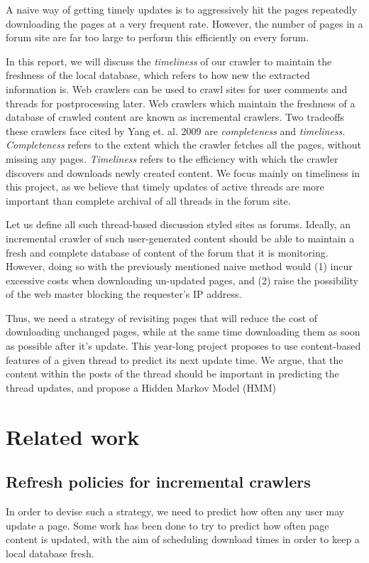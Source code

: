 \documentclass[12 pt]{article}
\begin{document}
A naive way of getting timely updates is to aggressively hit the pages repeatedly downloading the pages at a very
frequent rate. However, the number of pages in a forum site are far too large to perform this efficiently on every
forum.

In this report, we will discuss the \emph{timeliness} of our crawler to maintain the freshness of the local database, which refers to how new the extracted information is. Web crawlers can be used to crawl sites for user comments and threads for postprocessing later. Web crawlers which maintain the freshness of a database of crawled content are known as incremental crawlers. Two tradeoffs these crawlers face cited by Yang et. al. 2009 \cite{Yang2009} are \emph{completeness} and \emph{timeliness}. \emph{Completeness} refers to the extent which the crawler fetches all the pages, without missing any pages. \emph{Timeliness} refers to the efficiency with which the crawler discovers and downloads newly created content. We focus mainly on timeliness in this project, as we believe that timely updates of active threads are more important than complete archival of all threads in the forum site.

Let us define all such thread-based discussion styled sites as forums. Ideally, an incremental crawler of such user-generated content should be able to maintain a fresh and complete database of content of the forum that it is monitoring. However, doing so with the previously mentioned naive method would (1) incur excessive costs when downloading un-updated pages, and (2) raise the possibility of the web master blocking the requester's IP address.

Thus, we need a strategy of revisiting pages that will reduce the cost of downloading unchanged pages, while at the same time downloading them as soon as possible after it's update. This year-long project proposes to use content-based features of a given thread to predict its next update time. We argue, that the content within the posts of the thread should be important in predicting the thread updates, and propose a Hidden Markov Model (HMM)

\section{Related work}

\subsection{Refresh policies for incremental crawlers}
In order to devise such a strategy, we need to predict how often any user may update a page. Some work has been done to try to predict how often page content is updated, with the aim of scheduling download times in order to keep a local database fresh.
\end{document}
